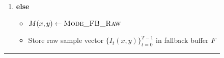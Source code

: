 \begin{figure}[h]
\begin{minipage}{0.95\linewidth}
\begin{enumerate}
\begin{enumerate}
\begin{itemize}
\begin{itemize}
                \item $A(x, y) \leftarrow \text{quantize}(\hat{a})$
            \end{itemize}
            \item \textbf{else}
            \begin{itemize}
                \item $M(x, y) \leftarrow \textsc{Mode\_TFC\_Linear}$
                \item $A(x, y) \leftarrow \text{quantize}(\hat{a})$
                \item $B(x, y) \leftarrow \text{quantize}(\hat{b})$
            \end{itemize}
        \end{itemize}
        \item \textbf{else}
        \begin{itemize}
            \item $M(x, y) \leftarrow \textsc{Mode\_FB\_Raw}$
            \item Store raw sample vector $\{I_t(x, y)\}_{t=0}^{T-1}$ in fallback buffer $F$
        \end{itemize}
    \end{enumerate}
\end{enumerate}
\vspace{2mm} \hrule
\end{minipage}
\end{figure}
